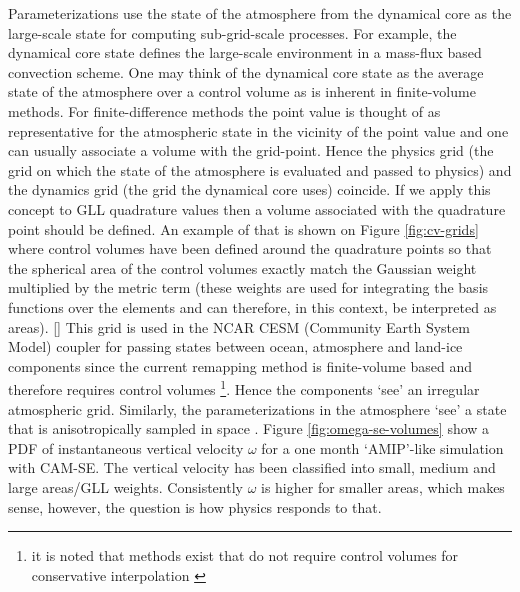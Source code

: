 \documentclass[twocol]{ametsoc}
\begin{document}
Parameterizations use the state of the atmosphere from the dynamical core as the large-scale state for computing sub-grid-scale processes. For example, the dynamical core state defines the large-scale environment in a mass-flux based convection scheme. One may think of the dynamical core state as the average state of the atmosphere over a control volume as is inherent in finite-volume methods. For finite-difference methods the point value is thought of as representative for the atmospheric state in the vicinity of the point value and one can usually associate a volume with the grid-point. Hence the physics grid (the grid on which the state of the atmosphere is evaluated and passed to physics) and the dynamics grid (the grid the dynamical core uses) coincide. If we apply this concept to GLL quadrature values then a volume associated with the quadrature point should be defined. An example of that is shown on Figure \ref{fig:cv-grids} where control volumes have been defined around the quadrature points so that the spherical area of the control volumes exactly match the Gaussian weight multiplied by the metric term (these weights are used for integrating the basis functions over the elements and can therefore, in this context, be interpreted as areas). [{\color{red}{Mark: could we be mathematically more rigorous? perhaps an appendix describing the iterative algorithm?}}] This grid is used in the NCAR CESM (Community Earth System Model) coupler for passing states between ocean, atmosphere and land-ice components since the current remapping method is finite-volume based and therefore requires control volumes {\footnote{it is noted that methods exist that do not require control volumes for conservative interpolation \citep{UT2015MWR}}}. Hence the components `see' an irregular atmospheric grid. Similarly, the parameterizations in the atmosphere `see' a state that is anisotropically sampled in space \citep[see Figure 1 and 5 in ][]{KetAl2008JGR}. Figure \ref{fig:omega-se-volumes} show a PDF of instantaneous vertical velocity $\omega$ for a one month `AMIP'-like simulation with CAM-SE. The vertical velocity has been classified into small, medium and large areas/GLL weights. Consistently $\omega$ is higher for smaller areas, which makes sense, however, the question is how physics responds to that.
\end{document}
